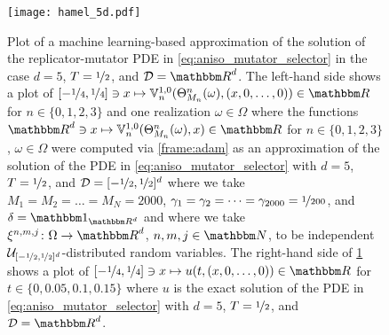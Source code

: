 \begin{table}
\begin{center}
{\begin{approxtabular}
			\hline
		\end{approxtabular}}
	\end{center}
	\caption{Numerical simulations for the approximation method in \cref{def:general_algorithm} in the case of the replicator-mutator PDEs in \eqref{eq:aniso_mutator_selector} in \cref{subsec:aniso_mutator_selector}
	where we assume for every
		$n,m,j\in\N$
	that
		$\mathcal D=\R^d$,
		$\xi^{n,m,j}=0$,
		$\gamma_m = \nicefrac{1}{100}$,
		and
		$M_n=1000$
	and where we assume for every
	  $\mathbf x\in\R^d$
	that
	  $\delta(\mathbf x)=(2\pi)^{-\nicefrac d2}\mathfrak t^{-d}\exp\bpr{-\tfrac{\norm{\mathbf x}^2}{2\mathfrak t^2}}$.
	}
	\label{table:aniso_mutator_selector}
\end{table}

\begin{figure}
	\centering
	\texttt{[image: hamel\_5d.pdf]}
	\caption{Plot of a machine learning-based approximation of the solution of the replicator-mutator PDE in \cref{eq:aniso_mutator_selector} in the case $d=5$, $T=\nicefrac12$, and $\mathcal D=\R^d$.
	The left-hand side shows a plot of $[-\nicefrac{1}{4}, \nicefrac{1}{4}] \ni x \mapsto \bV_n^{1,0}(\Theta^n_{M_n}(\omega),(x, 0, \dots,0)) \in \R$ for $n\in\{0,1,2,3\}$ and one realization $\omega\in\Omega$ where the functions $\R^d\ni x\mapsto \bV_n^{1,0}(\Theta^n_{M_n}(\omega),x)\in\R$ for $n\in\{0,1,2,3\}$, $\omega\in\Omega$ were computed via \cref{frame:adam} as an approximation of the solution of the PDE in \cref{eq:aniso_mutator_selector} with $d=5$, $T=\nicefrac12$, and $\mathcal D=[-\nicefrac 12,\nicefrac 12]^d$ where we take
		$M_1=M_2=\ldots=M_N=2000$,
		$\gamma_1=\gamma_2=\dots=\gamma_{2000}=\nicefrac{1}{200}$,
		and
		$\delta=\one_{\R^d}$
		and where we take
		$\xi^{n,m,j}\colon\Omega\to\R^d$, $n, m, j \in \N$,
		to be independent $\mathcal{U}_{[-\nicefrac{1}{2},\nicefrac{1}{2}]^d}$-distributed random variables.
	The right-hand side of \cref{fig:rep_mut} shows a plot of $[-\nicefrac{1}{4}, \nicefrac{1}{4}] \ni x \mapsto u(t, (x, 0,  \dots,0)) \in \R$ for $t\in\{0,0.05,0.1,0.15\}$ where $u$ is the exact solution of the PDE in \cref{eq:aniso_mutator_selector} with $d=5$, $T=\nicefrac12$, and $\mathcal D=\R^d$.
	\label{fig:rep_mut}}
\end{figure}


